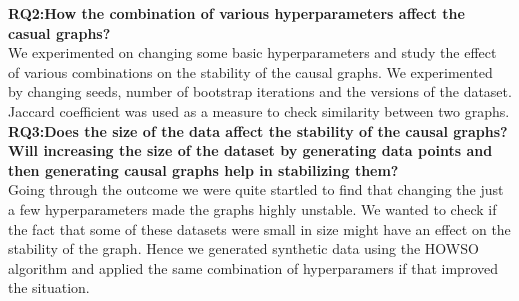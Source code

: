 \documentclass[sigconf,review,anonymous,nonacm=true]{acmart}
\begin{document}
\textbf{RQ2:How the combination of various hyperparameters affect the casual graphs?}\\
We experimented on changing some basic hyperparameters and study the effect of various combinations on the stability of the causal graphs. We experimented by changing seeds, number of bootstrap iterations and the versions of the dataset. Jaccard coefficient was used as a measure to check similarity between two graphs. \\
\textbf{RQ3:Does the size of the data affect the stability of the causal graphs? Will increasing the size of the dataset by generating data points and then generating causal graphs help in stabilizing them?}\\
Going through the outcome we were quite startled to find that changing the just a few hyperparameters made the graphs highly unstable. We wanted to check if the fact that some of these datasets were small in size might have an effect on the stability of the graph. Hence we generated synthetic data using the HOWSO algorithm and applied the same combination of hyperparamers if that improved the situation.  \\
\end{document}
